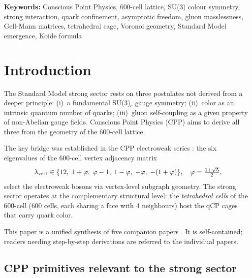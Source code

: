 \documentclass[11pt,a4paper]{article}
\newcommand{\phig}{\varphi}
\begin{document}
\noindent\textbf{Keywords:} Conscious Point Physics, 600-cell lattice,
SU(3) colour symmetry, strong interaction, quark confinement, asymptotic
freedom, gluon masslessness, Gell-Mann matrices, tetrahedral cage,
Voronoi geometry, Standard Model emergence, Koide formula

\raggedright

\tableofcontents
\newpage

\section{Introduction}

The Standard Model strong sector rests on three postulates not
derived from a deeper principle: (i)~a fundamental SU(3)$_c$ gauge
symmetry; (ii)~color as an intrinsic quantum number of quarks;
(iii)~gluon self-coupling as a given property of non-Abelian gauge
fields.  Conscious Point Physics (CPP) aims to derive all three from
the geometry of the 600-cell lattice.

The key bridge was established in the CPP electroweak series
\citep{cpp_ew_unified}: the six eigenvalues of the 600-cell vertex
adjacency matrix
\begin{equation}
\lambda_{\rm vert} \in
\{12,\;1+\phig,\;\phig-1,\;1-\phig,\;-\phig,\;-(1+\phig)\},
\quad\phig = \tfrac{1+\sqrt5}{2},
\label{eq:vertex_spectrum}
\end{equation}
select the electroweak bosons via vertex-level subgraph geometry.
The strong sector operates at the complementary structural level:
the \emph{tetrahedral cells} of the 600-cell (600 cells, each
sharing a face with 4 neighbours) host the qCP cages that carry
quark color.

This paper is a unified synthesis of five companion papers
\citep{cpp_ss1,cpp_ss2,cpp_ss3,cpp_ss4,cpp_ss5}.  It is
self-contained; readers needing step-by-step derivations are
referred to the individual papers.

\subsection{CPP primitives relevant to the strong sector}
\end{document}
